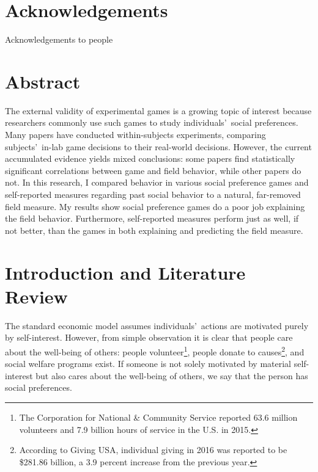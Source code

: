 \documentclass[12pt]{article}
\begin{document}


\newpage
\singlespacing
\tableofcontents
\thispagestyle{empty}


\newpage

\clearpage
{} 
\section*{Acknowledgements}
Acknowledgements to people


\newpage

\section*{Abstract}

\doublespacing
The external validity of experimental games is a growing topic of interest because researchers commonly use such games to study individuals\rq \ social preferences. Many papers have conducted within-subjects experiments, comparing subjects\rq \ in-lab game decisions to their real-world decisions. However, the current accumulated evidence yields mixed conclusions: some papers find statistically significant correlations between game and field behavior, while other papers do not. In this research, I compared behavior in various social preference games and self-reported measures regarding past social behavior to a natural, far-removed field measure. {\color{red}My results show social preference games do a poor job explaining the field behavior. Furthermore, self-reported measures perform just as well, if not better, than the games in both explaining and predicting the field measure.}



\newpage


\doublespacing
\section{Introduction and Literature Review}

The standard economic model assumes individuals\rq \ actions are motivated purely by self-interest. However, from simple observation it is clear that people care about the well-being of others: people volunteer\footnote{The Corporation for National \& Community Service reported 63.6 million volunteers and 7.9 billion hours of service in the U.S. in 2015.}, people donate to causes\footnote{According to Giving USA, individual giving in 2016 was reported to be \$281.86 billion, a 3.9 percent increase from the previous year.}, and social welfare programs exist. If someone is not solely motivated by material self-interest but also cares about the well-being of others, we say that the person has social preferences. 
\end{document}
